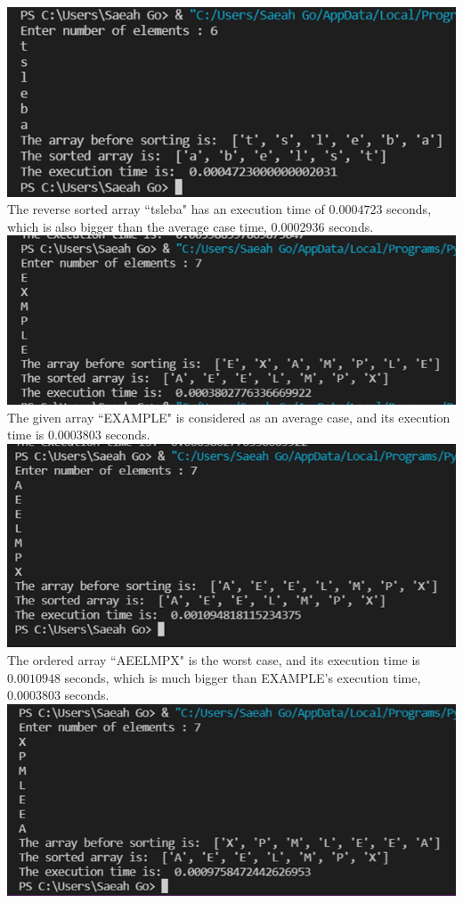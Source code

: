 \documentclass{article}
\begin{document}
\includegraphics[scale = 0.7]{Reversed tables} \\
The reverse sorted array ``tsleba" has an execution time of $0.0004723$ seconds, which is also bigger than the average case time, $0.0002936$ seconds. \\
\includegraphics[scale = 0.7]{EXAMPLE} \\
The given array ``EXAMPLE" is considered as an average case, and its execution time is $0.0003803$ seconds. \\
\includegraphics[scale = 0.7]{Ordered EXAMPLE} \\
The ordered array ``AEELMPX" is the worst case, and its execution time is $0.0010948$ seconds, which is much bigger than EXAMPLE's execution time, $0.0003803$ seconds. \\ 
\includegraphics[scale = 0.7]{Reversed EXAMPLE} \\
\end{document}
